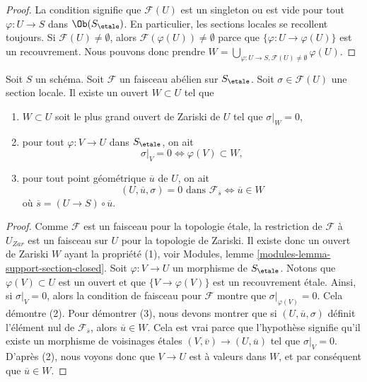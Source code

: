 \begin{proof}
La condition signifie que $\mathcal{F}(U)$ est un singleton ou est
vide pour tout $\varphi : U \to S$ dans $\Ob(S_\etale)$.
En particulier, les sections locales se recollent toujours. Si
$\mathcal{F}(U) \not = \emptyset$, alors
$\mathcal{F}(\varphi(U)) \not = \emptyset$ parce que
$\{\varphi : U \to \varphi(U)\}$ est un recouvrement.
Nous pouvons donc prendre
$W = \bigcup_{\varphi : U \to S, \mathcal{F}(U) \not = \emptyset} \varphi(U)$.
\end{proof}

\begin{lemma}
\label{lemma-zero-over-image}
Soit $S$ un sch\'ema.
Soit $\mathcal{F}$ un faisceau ab\'elien sur $S_\etale$.
Soit $\sigma \in \mathcal{F}(U)$ une section locale.
Il existe un ouvert $W \subset U$ tel que
\begin{enumerate}
\item $W \subset U$ soit le plus grand ouvert de Zariski de $U$ tel
que $\sigma|_W = 0$,
\item pour tout $\varphi : V \to U$ dans $S_\etale$, on ait
$$
\sigma|_V = 0 \Leftrightarrow \varphi(V) \subset W,
$$
\item pour tout point g\'eom\'etrique $\overline{u}$ de $U$, on ait
$$
(U, \overline{u}, \sigma) = 0\text{ dans }\mathcal{F}_{\overline{s}}
\Leftrightarrow
\overline{u} \in W
$$
o\`u $\overline{s} = (U \to S) \circ \overline{u}$.
\end{enumerate}
\end{lemma}

\begin{proof}
Comme $\mathcal{F}$ est un faisceau pour la topologie \'etale, la restriction de
$\mathcal{F}$ \`a $U_{Zar}$ est un faisceau sur $U$ pour la topologie de Zariski.
Il existe donc un ouvert de Zariski $W$ ayant la propri\'et\'e (1), voir
Modules, lemme \ref{modules-lemma-support-section-closed}. Soit
$\varphi : V \to U$ un morphisme de $S_\etale$. Notons que
$\varphi(V) \subset U$ est un ouvert et que
$\{V \to \varphi(V)\}$ est un recouvrement \'etale. Ainsi, si
$\sigma|_V = 0$, alors la condition de faisceau pour $\mathcal{F}$ montre
que $\sigma|_{\varphi(V)} = 0$. Cela d\'emontre (2).
Pour d\'emontrer (3), nous devons montrer que si $(U, \overline{u}, \sigma)$
d\'efinit l'\'el\'ement nul de $\mathcal{F}_{\overline{s}}$, alors
$\overline{u} \in W$. Cela est vrai parce que l'hypoth\`ese signifie
qu'il existe un morphisme de voisinages \'etales
$(V, \overline{v}) \to (U, \overline{u})$ tel que
$\sigma|_V = 0$. D'apr\`es (2), nous voyons donc que $V \to U$ est \`a valeurs dans $W$, et
par cons\'equent que $\overline{u} \in W$.
\end{proof}

